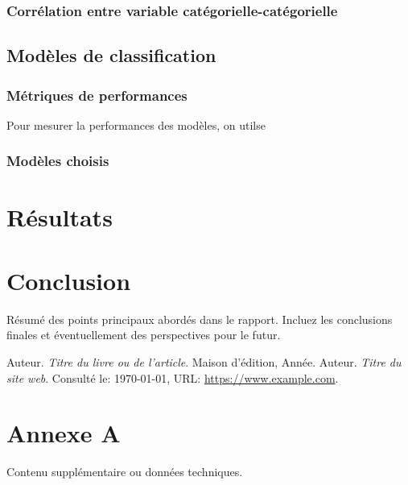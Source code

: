 \documentclass[a4paper,12pt]{report}
\begin{document}
\subsection{Corrélation entre variable catégorielle-catégorielle}


\section{Modèles de classification}

\subsection{Métriques de performances}

Pour mesurer la performances des modèles, on utilse

\subsection{Modèles choisis}

\chapter{Résultats}

\chapter{Conclusion}
Résumé des points principaux abordés dans le rapport. Incluez les conclusions finales et éventuellement des perspectives pour le futur.

\begin{thebibliography}{99}
 Auteur. \emph{Titre du livre ou de l'article}. Maison d'édition, Année.
 Auteur. \emph{Titre du site web}. Consulté le: \today, URL: \url{https://www.example.com}.
\end{thebibliography}

\appendix
\chapter{Annexe A}
Contenu supplémentaire ou données techniques.
\end{document}
